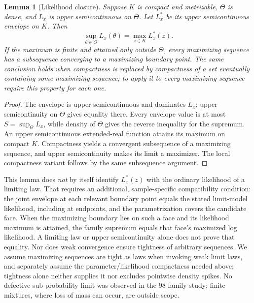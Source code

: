 \documentclass[11pt]{article}
\theoremstyle{plain}
\newtheorem{lemma}{Lemma}
\theoremstyle{definition}
\theoremstyle{remark}
\begin{document}
\begin{lemma}[Likelihood closure]\label{lem:closure}
Suppose $K$ is compact and metrizable, $\Theta$ is dense, and $L_x$ is upper semicontinuous on $\Theta$. Let $L_x^*$ be its upper semicontinuous envelope on $K$. Then
\[
 \sup_{\theta\in\Theta} L_x(\theta)=\max_{z\in K} L_x^*(z).
\]
If the maximum is finite and attained only outside $\Theta$, every maximizing sequence has a subsequence converging to a maximizing boundary point. The same conclusion holds when compactness is replaced by compactness of a set eventually containing some maximizing sequence; to apply it to \emph{every} maximizing sequence require this property for each one.
\end{lemma}
\begin{proof}
The envelope is upper semicontinuous and dominates $L_x$; upper semicontinuity on $\Theta$ gives equality there. Every envelope value is at most $S=\sup_\Theta L_x$, while density of $\Theta$ gives the reverse inequality for the supremum. An upper semicontinuous extended-real function attains its maximum on compact $K$. Compactness yields a convergent subsequence of a maximizing sequence, and upper semicontinuity makes its limit a maximizer. The local compactness variant follows by the same subsequence argument.
\end{proof}
This lemma does \emph{not} by itself identify $L_x^*(z)$ with the ordinary likelihood of a limiting law. That requires an additional, sample-specific compatibility condition: the joint envelope at each relevant boundary point equals the stated limit-model likelihood, including at endpoints, and the parametrization covers the candidate face. When the maximizing boundary lies on such a face and its likelihood maximum is attained, the family supremum equals that face's maximized log likelihood. A limiting law or upper semicontinuity alone does not prove that equality. Nor does weak convergence ensure tightness of arbitrary sequences. We assume maximizing sequences are tight as laws when invoking weak limit laws, and separately assume the parameter/likelihood compactness needed above; tightness alone neither supplies it nor excludes pointwise density spikes. No defective sub-probability limit was observed in the 98-family study; finite mixtures, where loss of mass can occur, are outside scope.
\end{document}

